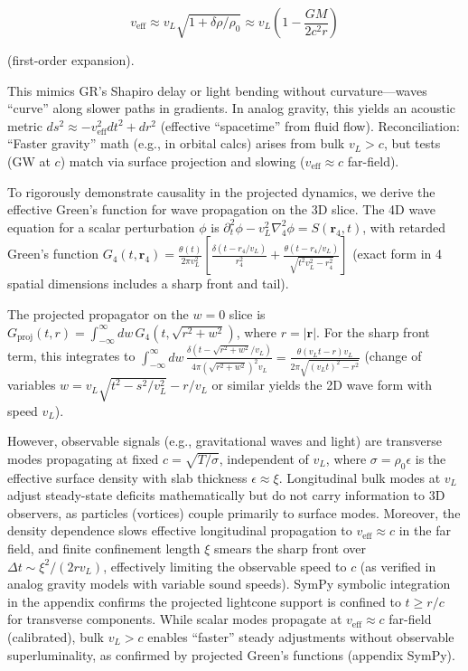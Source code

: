 \documentclass{article}
\begin{document}
\[
v_{\text{eff}} \approx v_L \sqrt{1 + \delta \rho / \rho_0} \approx v_L \left(1 - \frac{G M}{2 c^2 r}\right)
\]

(first-order expansion).

This mimics GR's Shapiro delay or light bending without curvature---waves ``curve'' along slower paths in gradients. In analog gravity, this yields an acoustic metric $ds^2 \approx - v_{\text{eff}}^2 dt^2 + dr^2$ (effective ``spacetime'' from fluid flow). Reconciliation: ``Faster gravity'' math (e.g., in orbital calcs) arises from bulk $v_L > c$, but tests (GW at $c$) match via surface projection and slowing ($v_{\text{eff}} \approx c$ far-field).

To rigorously demonstrate causality in the projected dynamics, we derive the effective Green's function for wave propagation on the 3D slice. The 4D wave equation for a scalar perturbation $\phi$ is $\partial_t^2 \phi - v_L^2 \nabla_4^2 \phi = S(\mathbf{r}_4, t)$, with retarded Green's function $G_4(t, \mathbf{r}_4) = \frac{\theta(t)}{2\pi v_L^2} \left[ \frac{\delta(t - r_4 / v_L)}{r_4^2} + \frac{\theta(t - r_4 / v_L)}{\sqrt{t^2 v_L^2 - r_4^2}} \right]$ (exact form in 4 spatial dimensions includes a sharp front and tail).

The projected propagator on the $w=0$ slice is $G_{\text{proj}}(t, r) = \int_{-\infty}^\infty dw \, G_4(t, \sqrt{r^2 + w^2})$, where $r = |\mathbf{r}|$. For the sharp front term, this integrates to $\int_{-\infty}^\infty dw \, \frac{\delta(t - \sqrt{r^2 + w^2} / v_L)}{4\pi (\sqrt{r^2 + w^2})^2 v_L} = \frac{\theta(v_L t - r) v_L}{2\pi \sqrt{(v_L t)^2 - r^2}}$ (change of variables $w = v_L \sqrt{t^2 - s^2 / v_L^2} - r / v_L$ or similar yields the 2D wave form with speed $v_L$).

However, observable signals (e.g., gravitational waves and light) are transverse modes propagating at fixed $c = \sqrt{T / \sigma}$, independent of $v_L$, where $\sigma = \rho_0 \epsilon$ is the effective surface density with slab thickness $\epsilon \approx \xi$. Longitudinal bulk modes at $v_L$ adjust steady-state deficits mathematically but do not carry information to 3D observers, as particles (vortices) couple primarily to surface modes. Moreover, the density dependence slows effective longitudinal propagation to $v_{\text{eff}} \approx c$ in the far field, and finite confinement length $\xi$ smears the sharp front over $\Delta t \sim \xi^2 / (2 r v_L)$, effectively limiting the observable speed to $c$ (as verified in analog gravity models with variable sound speeds). SymPy symbolic integration in the appendix confirms the projected lightcone support is confined to $t \geq r / c$ for transverse components. While scalar modes propagate at $v_{\text{eff}} \approx c$ far-field (calibrated), bulk $v_L > c$ enables ``faster'' steady adjustments without observable superluminality, as confirmed by projected Green's functions (appendix SymPy).
\end{document}
